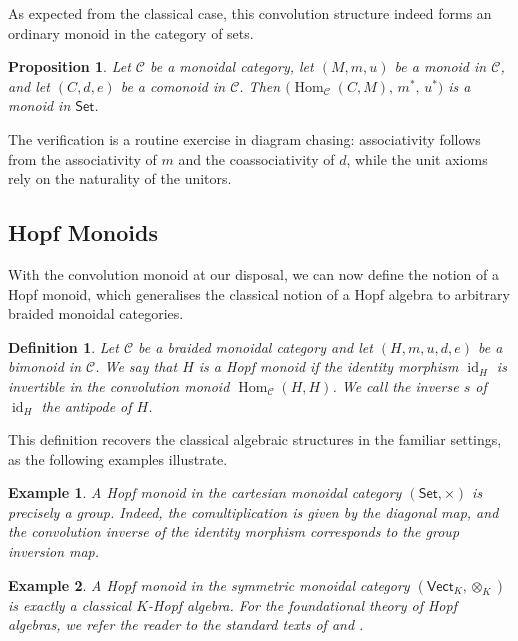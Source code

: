 \documentclass{amsart}
\newcommand{\Set}{\mathsf{Set}}
\newcommand{\Vect}{\mathsf{Vect}}
\newcommand{\VectK}{\Vect_K}
\newtheorem{proposition}{Proposition}[section]
\newtheorem{definition}{Definition}[section]
\newtheorem{example}{Example}[section]
\begin{document}
As expected from the classical case, this convolution structure indeed forms an ordinary monoid in the category of sets.

\begin{proposition}\label{prop:convolution_monoid}
Let $\mathcal{C}$ be a monoidal category, let $(M, m, u)$ be a monoid in $\mathcal{C}$, and let $(C, d, e)$ be a comonoid in $\mathcal{C}$. Then $\bigl(\operatorname{Hom}_{\mathcal{C}}(C, M), \, m^*, \, u^*\bigr)$ is a monoid in $\Set$.
\end{proposition}

The verification is a routine exercise in diagram chasing: associativity follows from the associativity of $m$ and the coassociativity of $d$, while the unit axioms rely on the naturality of the unitors.

\subsection{Hopf Monoids}

With the convolution monoid at our disposal, we can now define the notion of a Hopf monoid, which generalises the classical notion of a Hopf algebra to arbitrary braided monoidal categories.

\begin{definition}\label{def:hopf_monoid}
Let $\mathcal{C}$ be a braided monoidal category and let $(H, m, u, d, e)$ be a bimonoid in $\mathcal{C}$. We say that $H$ is a Hopf monoid if the identity morphism $\operatorname{id}_H$ is invertible in the convolution monoid $\operatorname{Hom}_{\mathcal{C}}(H, H)$. We call the inverse $s$ of $\operatorname{id}_H$ the antipode of $H$.
\end{definition}

This definition recovers the classical algebraic structures in the familiar settings, as the following examples illustrate.

\begin{example}\label{ex:hopf_group}
A Hopf monoid in the cartesian monoidal category $(\Set, \times)$ is precisely a group. Indeed, the comultiplication is given by the diagonal map, and the convolution inverse of the identity morphism corresponds to the group inversion map.
\end{example}

\begin{example}\label{ex:hopf_algebra}
A Hopf monoid in the symmetric monoidal category $(\VectK, \otimes_K)$ is exactly a classical $K$-Hopf algebra. For the foundational theory of Hopf algebras, we refer the reader to the standard texts of \cite{Sweedler} and \cite{Abe}.
\end{example}
\end{document}
